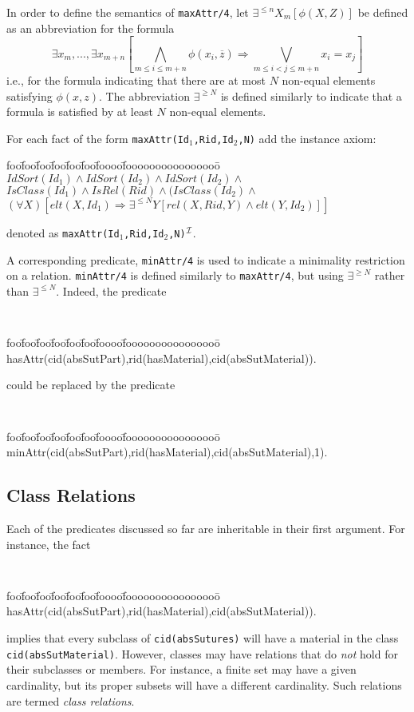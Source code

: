 In order to define the semantics of {\tt maxAttr/4}, let
$\exists^{\leq n}X_m[ \phi(X,Z)]$ be defined as an abbreviation for
the formula
\[
  \exists x_m,...,\exists x_{m+n} [\bigwedge_{m \leq i \leq m+n} 
	\phi(x_i,\overline{z}) 
	\Rightarrow \bigvee_{m \leq i < j \leq m+n} x_i  = x_j]
\]
i.e., for the formula indicating that there are at most $N$ non-equal
elements satisfying $\phi(x,z)$.  The abbreviation $\exists^{\geq N}$
is defined similarly to indicate that a formula is satisfied by at
least $N$ non-equal elements.

\begin{instance}  \rm 
For each fact of the form {\tt maxAttr(Id$_1$,Rid,Id$_2$,N)} add the instance
axiom: 
\begin{tabbing}
foo\=foo\=foo\=foo\=foo\=foo\=foooo\=foooooooooooooooo\=\kill
\> $ IdSort(Id_1) \wedge IdSort(Id_2) \wedge IdSort(Id_2) \wedge $ \\
\> \> $ IsClass(Id_1) \wedge IsRel(Rid) \wedge
	 (IsClass(Id_2) \wedge $ \\
\> \> \> $ (\forall X) [elt(X,Id_1) \Rightarrow \exists^{\leq N} Y [rel(X,Rid,Y) 
					\wedge elt(Y,Id_2)]]$
\end{tabbing}
denoted as {\tt maxAttr(Id$_1$,Rid,Id$_2$,N)$^{{\cal I}}$}.
\end{instance}

A corresponding predicate, {\tt minAttr/4} is used to indicate a
minimality restriction on a relation.  {\tt minAttr/4} is defined
similarly to {\tt maxAttr/4}, but using $\exists^{\geq N}$ rather than
$\exists^{\leq N}$.  Indeed, the predicate
%
{\small {\tt 
\begin{tabbing}
foo\=foo\=foo\=foo\=foo\=foo\=foooo\=foooooooooooooooo\=\kill
\> hasAttr(cid(absSutPart),rid(hasMaterial),cid(absSutMaterial)).
\end{tabbing}
} }
%
\noindent
could be replaced by the predicate
%
{\small {\tt 
\begin{tabbing}
foo\=foo\=foo\=foo\=foo\=foo\=foooo\=foooooooooooooooo\=\kill
\> minAttr(cid(absSutPart),rid(hasMaterial),cid(absSutMaterial),1).
\end{tabbing}
} }
%
\subsection{Class Relations}
Each of the predicates discussed so far are inheritable in their first
argument.  For instance, the fact
{\small {\tt 
\begin{tabbing}
foo\=foo\=foo\=foo\=foo\=foo\=foooo\=foooooooooooooooo\=\kill
\> hasAttr(cid(absSutPart),rid(hasMaterial),cid(absSutMaterial)).
\end{tabbing}
} } 
%
\noindent
implies that every subclass of {\tt cid(absSutures)} will have a
material in the class {\tt cid(absSutMaterial)}.  However, classes may
have relations that do {\em not} hold for their subclasses or members.
For instance, a finite set may have a given cardinality, but its
proper subsets will have a different cardinality.  Such relations are
termed {\em class relations}.

